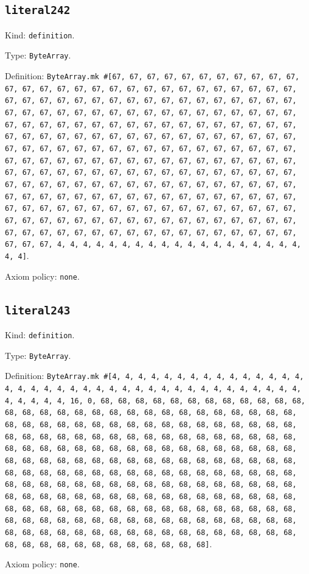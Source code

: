 \documentclass[11pt]{article}
\begin{document}
\subsection*{\texttt{literal242}}
\noindent Kind: \texttt{definition}.\par
\noindent Type: \texttt{ByteArray}.\par
\noindent Definition: \texttt{ByteArray.mk \#[67, 67, 67, 67, 67, 67, 67, 67, 67, 67, 67, 67, 67, 67, 67, 67, 67, 67, 67, 67, 67, 67, 67, 67, 67, 67, 67, 67, 67, 67, 67, 67, 67, 67, 67, 67, 67, 67, 67, 67, 67, 67, 67, 67, 67, 67, 67, 67, 67, 67, 67, 67, 67, 67, 67, 67, 67, 67, 67, 67, 67, 67, 67, 67, 67, 67, 67, 67, 67, 67, 67, 67, 67, 67, 67, 67, 67, 67, 67, 67, 67, 67, 67, 67, 67, 67, 67, 67, 67, 67, 67, 67, 67, 67, 67, 67, 67, 67, 67, 67, 67, 67, 67, 67, 67, 67, 67, 67, 67, 67, 67, 67, 67, 67, 67, 67, 67, 67, 67, 67, 67, 67, 67, 67, 67, 67, 67, 67, 67, 67, 67, 67, 67, 67, 67, 67, 67, 67, 67, 67, 67, 67, 67, 67, 67, 67, 67, 67, 67, 67, 67, 67, 67, 67, 67, 67, 67, 67, 67, 67, 67, 67, 67, 67, 67, 67, 67, 67, 67, 67, 67, 67, 67, 67, 67, 67, 67, 67, 67, 67, 67, 67, 67, 67, 67, 67, 67, 67, 67, 67, 67, 67, 67, 67, 67, 67, 67, 67, 67, 67, 67, 67, 67, 67, 67, 67, 67, 67, 67, 67, 67, 67, 67, 67, 67, 67, 67, 67, 67, 67, 67, 67, 67, 67, 67, 67, 67, 67, 67, 67, 67, 67, 67, 67, 67, 4, 4, 4, 4, 4, 4, 4, 4, 4, 4, 4, 4, 4, 4, 4, 4, 4, 4, 4, 4, 4]}.\par
\noindent Axiom policy: \texttt{none}.\par
\subsection*{\texttt{literal243}}
\noindent Kind: \texttt{definition}.\par
\noindent Type: \texttt{ByteArray}.\par
\noindent Definition: \texttt{ByteArray.mk \#[4, 4, 4, 4, 4, 4, 4, 4, 4, 4, 4, 4, 4, 4, 4, 4, 4, 4, 4, 4, 4, 4, 4, 4, 4, 4, 4, 4, 4, 4, 4, 4, 4, 4, 4, 4, 4, 4, 4, 4, 4, 4, 4, 16, 0, 68, 68, 68, 68, 68, 68, 68, 68, 68, 68, 68, 68, 68, 68, 68, 68, 68, 68, 68, 68, 68, 68, 68, 68, 68, 68, 68, 68, 68, 68, 68, 68, 68, 68, 68, 68, 68, 68, 68, 68, 68, 68, 68, 68, 68, 68, 68, 68, 68, 68, 68, 68, 68, 68, 68, 68, 68, 68, 68, 68, 68, 68, 68, 68, 68, 68, 68, 68, 68, 68, 68, 68, 68, 68, 68, 68, 68, 68, 68, 68, 68, 68, 68, 68, 68, 68, 68, 68, 68, 68, 68, 68, 68, 68, 68, 68, 68, 68, 68, 68, 68, 68, 68, 68, 68, 68, 68, 68, 68, 68, 68, 68, 68, 68, 68, 68, 68, 68, 68, 68, 68, 68, 68, 68, 68, 68, 68, 68, 68, 68, 68, 68, 68, 68, 68, 68, 68, 68, 68, 68, 68, 68, 68, 68, 68, 68, 68, 68, 68, 68, 68, 68, 68, 68, 68, 68, 68, 68, 68, 68, 68, 68, 68, 68, 68, 68, 68, 68, 68, 68, 68, 68, 68, 68, 68, 68, 68, 68, 68, 68, 68, 68, 68, 68, 68, 68, 68, 68, 68, 68, 68, 68, 68, 68, 68, 68, 68, 68, 68, 68, 68, 68, 68, 68, 68, 68, 68, 68, 68, 68, 68]}.\par
\noindent Axiom policy: \texttt{none}.\par
\end{document}
